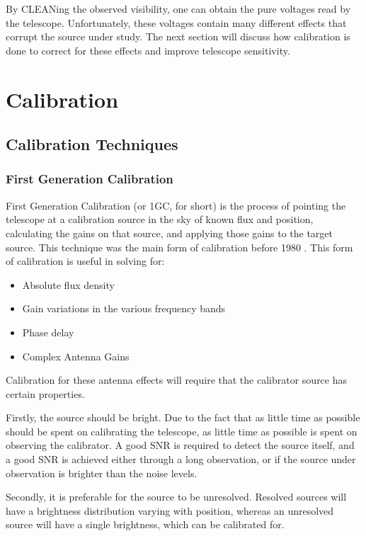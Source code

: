 \documentclass{article}
\begin{document}
By CLEANing the observed visibility, one can obtain the pure voltages read by the telescope. Unfortunately, these voltages contain many different effects that corrupt the source under study. The next section will discuss how calibration is done to correct for these effects and improve telescope sensitivity.

\section{Calibration}

\subsection{Calibration Techniques}

\subsubsection{First Generation Calibration}
First Generation Calibration (or 1GC, for short) is the process of pointing the telescope at a calibration source in the sky of known flux and position, calculating the gains on that source, and applying those gains to the target source. This technique was the main form of calibration before 1980 \citep{meqtrees}. This form of calibration is useful in solving for:
\begin{itemize}
    \item Absolute flux density
    \item Gain variations in the various frequency bands
    \item Phase delay
    \item Complex Antenna Gains
\end{itemize}
Calibration for these antenna effects will require that the calibrator source has certain properties. 

Firstly, the source should be bright. Due to the fact that as little time as possible should be spent on calibrating the telescope, as little time as possible is spent on observing the calibrator. A good SNR is required to detect the source itself, and a good SNR is achieved either through a long observation, or if the source under observation is brighter than the noise levels.

Secondly, it is preferable for the source to be unresolved. Resolved sources will have a brightness distribution varying with position, whereas an unresolved source will have a single brightness, which can be calibrated for.
\end{document}
